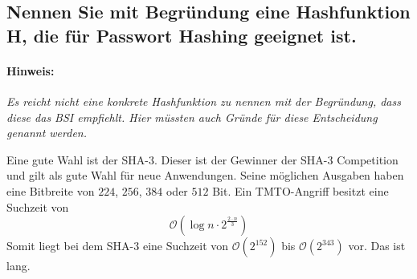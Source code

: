 \subsection{Nennen Sie mit Begründung eine Hashfunktion H, die für Passwort Hashing geeignet ist.}
\paragraph{Hinweis:} \textit{Es reicht nicht eine konkrete Hashfunktion zu nennen mit der Begründung, dass diese das BSI empfiehlt. Hier müssten auch Gründe für diese Entscheidung genannt werden.}

Eine gute Wahl ist der SHA-3. Dieser ist der Gewinner der SHA-3 Competition und gilt als gute Wahl für neue Anwendungen. Seine möglichen Ausgaben haben eine Bitbreite von $224$, $256$, $384$ oder $512$ Bit. Ein TMTO-Angriff besitzt eine Suchzeit von
$$
\mathcal{O}(\log n \cdot  2^\frac{2 \cdot n}{3})
$$
Somit liegt bei dem SHA-3 eine Suchzeit von $\mathcal{O}(2^{152})$ bis $\mathcal{O}(2^{343})$ vor. Das ist lang.